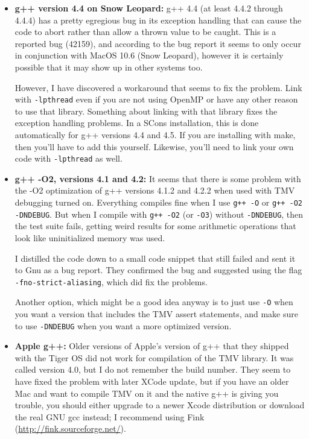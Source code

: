 \documentclass[twoside,letterpaper,11pt]{article}
\renewcommand{\tt}[1]{{\lstinline {#1}}}
\begin{document}
\begin{itemize}
\item {\bf g++ version 4.4 on Snow Leopard:}
g++ 4.4 (at least 4.4.2 through 4.4.4) has a pretty egregious bug in its exception handling that 
can cause the code to abort rather than allow a thrown value to be caught.  
This is a reported bug (42159), and according to the bug report it seems to only occur in
conjunction with MacOS 10.6 (Snow Leopard), however it is certainly possible that it 
may show up in other systems too.

However, I have discovered a workaround that seems to fix the problem.  Link with 
\tt{-lpthread} even if you are not using OpenMP or have any other reason to use that
library.  Something about linking with that library fixes the exception handling problems.
In a SCons installation, this is done automatically for g++ versions 4.4 and 4.5.  
If you are installing with make, then you'll have to add this yourself.
Likewise, you'll need to link your own code with \tt{-lpthread} as well.

\item {\bf g++ -O2, versions 4.1 and 4.2:}
It seems that there is some problem with the -O2 optimization of g++ versions 4.1.2 and 4.2.2
when used with TMV debugging turned on.  Everything compiles fine when I use
\texttt{g++ -O} or \texttt{g++ -O2 -DNDEBUG}.  But when I compile with \texttt{g++ -O2} (or \texttt{-O3}) without
\texttt{-DNDEBUG}, then the test suite fails, getting weird results for some arithmetic operations
that look like uninitialized memory was used.  

I distilled the code down to a small code snippet that still failed 
and sent it to Gnu as a bug report.
They confirmed the bug and suggested
using the flag \texttt{-fno-strict-aliasing}, which did fix the problems.

Another option, which might be a good idea anyway is to just use \texttt{-O} 
when you want a version that 
includes the TMV assert statements, and make sure to use \texttt{-DNDEBUG} 
when you want a more optimized version.

\item {\bf Apple g++:}
Older versions of Apple's version of g++ that they shipped with the Tiger OS did not work for 
compilation of the TMV library.  It was called version 4.0, but I do not remember the build number.
They seem to have fixed the problem with later XCode update,
but if you have an older Mac and want to compile TMV on it and the native g++ 
is giving you trouble,
you should either upgrade to a newer Xcode distribution or download the real GNU gcc instead;  
I recommend using Fink (\url{http://fink.sourceforge.net/}).


\end{itemize}
\end{document}
